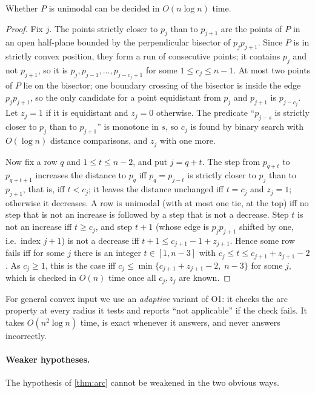 \begin{lemma}\label{lem:unitest}
Whether $P$ is unimodal can be decided in $O(n\log n)$ time.
\end{lemma}
\begin{proof}
Fix $j$. The points strictly closer to $p_j$ than to $p_{j+1}$ are the points
of $P$ in an open half-plane bounded by the perpendicular bisector of
$p_jp_{j+1}$. Since $P$ is in strictly convex position, they form a run of
consecutive points; it contains $p_j$ and not $p_{j+1}$, so it is
$p_j,p_{j-1},\dots,p_{j-c_j+1}$ for some $1\le c_j\le n-1$. At most two points
of $P$ lie on the bisector; one boundary crossing of the bisector is inside the
edge $p_jp_{j+1}$, so the only candidate for a point equidistant from $p_j$ and
$p_{j+1}$ is $p_{j-c_j}$. Let $z_j=1$ if it is equidistant and $z_j=0$
otherwise. The predicate ``$p_{j-s}$ is strictly closer to $p_j$ than to
$p_{j+1}$'' is monotone in $s$, so $c_j$ is found by binary search with
$O(\log n)$ distance comparisons, and $z_j$ with one more.

Now fix a row $q$ and $1\le t\le n-2$, and put $j=q+t$. The step from
$p_{q+t}$ to $p_{q+t+1}$ increases the distance to $p_q$ iff $p_q=p_{j-t}$ is
strictly closer to $p_j$ than to $p_{j+1}$, that is, iff $t<c_j$; it leaves the
distance unchanged iff $t=c_j$ and $z_j=1$; otherwise it decreases. A row is
unimodal (with at most one tie, at the top) iff no step that is not an
increase is followed by a step that is not a decrease. Step $t$ is not an
increase iff $t\ge c_j$, and step $t+1$ (whose edge is $p_{j}p_{j+1}$ shifted
by one, i.e.\ index $j+1$) is not a decrease iff $t+1\le c_{j+1}-1+z_{j+1}$.
Hence some row fails iff for some $j$ there is an integer
$t\in[1,n-3]$ with $c_j\le t\le c_{j+1}+z_{j+1}-2$. As $c_j\ge1$, this is the
case iff $c_j\le\min\{c_{j+1}+z_{j+1}-2,\;n-3\}$ for some $j$, which is
checked in $O(n)$ time once all $c_j,z_j$ are known.
\end{proof}

For general convex input we use an \emph{adaptive} variant of \textsc{O1}: it
checks the arc property at every radius it tests and reports ``not
applicable'' if the check fails. It takes $O(n^2\log n)$ time, is exact
whenever it answers, and never answers incorrectly.

\paragraph{Weaker hypotheses.}
The hypothesis of \cref{thm:arc} cannot be weakened in the two obvious ways.


